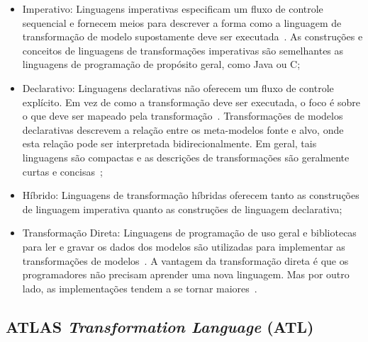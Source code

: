 \begin{itemize}
	\item Imperativo: Linguagens imperativas especificam um fluxo de controle sequencial e fornecem meios para descrever a forma como a linguagem de transformação de modelo supostamente deve ser executada~\cite{Mens_2006}. As construções e conceitos de linguagens de transformações imperativas são semelhantes as linguagens de programação de propósito geral, como Java ou C;
	\item Declarativo: Linguagens declarativas não oferecem um fluxo de controle explícito. Em vez de como a transformação deve ser executada, o foco é sobre o que deve ser mapeado pela transformação~\cite{Mens_2006}. Transformações de modelos declarativas descrevem a relação entre os meta-modelos fonte e alvo, onde esta relação pode ser interpretada bidirecionalmente. Em geral, tais linguagens são compactas e as descrições de transformações são geralmente curtas e concisas~\cite{Biehl_2010, Mens_2006};
	\item Híbrido: Linguagens de transformação híbridas oferecem tanto as construções de linguagem imperativa quanto as construções de linguagem declarativa;
	\item Transformação Direta: Linguagens de programação de uso geral e bibliotecas para ler e gravar os dados dos modelos são utilizadas para implementar as transformações de modelos~\cite{transformation_huber}. A vantagem da transformação direta é que os programadores não precisam aprender uma nova linguagem. Mas por outro lado, as implementações tendem a se tornar maiores~\cite{Biehl_2010}.
\end{itemize}



\subsection{ATLAS \emph{Transformation Language} (ATL)} %
\label{sub:atl_transformation_language}

